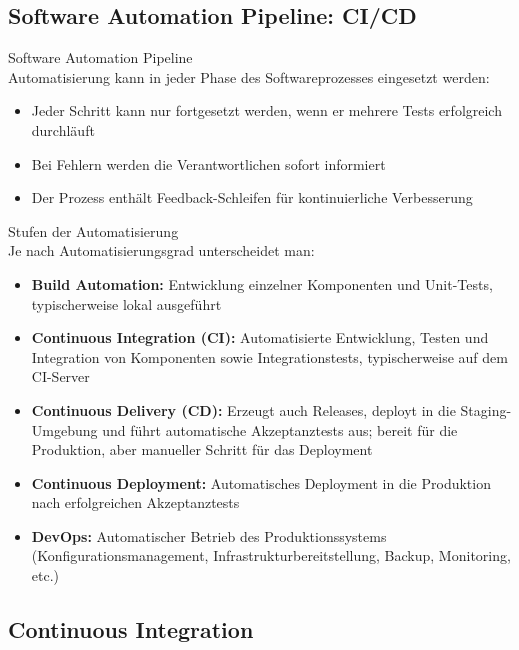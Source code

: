 \subsection{Software Automation Pipeline: CI/CD}

\begin{concept}{Software Automation Pipeline}\\
    Automatisierung kann in jeder Phase des Softwareprozesses eingesetzt werden:
    \begin{itemize}
        \item Jeder Schritt kann nur fortgesetzt werden, wenn er mehrere Tests erfolgreich durchläuft
        \item Bei Fehlern werden die Verantwortlichen sofort informiert
        \item Der Prozess enthält Feedback-Schleifen für kontinuierliche Verbesserung
    \end{itemize}
\end{concept}

\begin{definition}{Stufen der Automatisierung}\\
    Je nach Automatisierungsgrad unterscheidet man:
    \begin{itemize}
        \item \textbf{Build Automation:} Entwicklung einzelner Komponenten und Unit-Tests, typischerweise lokal ausgeführt
        \item \textbf{Continuous Integration (CI):} Automatisierte Entwicklung, Testen und Integration von Komponenten sowie Integrationstests, typischerweise auf dem CI-Server
        \item \textbf{Continuous Delivery (CD):} Erzeugt auch Releases, deployt in die Staging-Umgebung und führt automatische Akzeptanztests aus; bereit für die Produktion, aber manueller Schritt für das Deployment
        \item \textbf{Continuous Deployment:} Automatisches Deployment in die Produktion nach erfolgreichen Akzeptanztests
        \item \textbf{DevOps:} Automatischer Betrieb des Produktionssystems (Konfigurationsmanagement, Infrastrukturbereitstellung, Backup, Monitoring, etc.)
    \end{itemize}
\end{definition}

\subsection{Continuous Integration}


